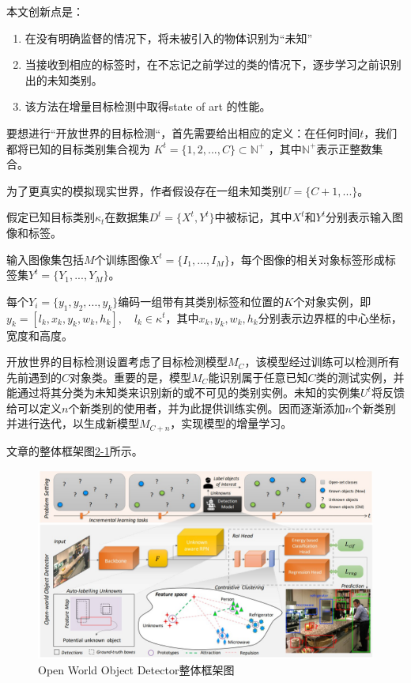 本文创新点是：
\begin{enumerate}
    \item 在没有明确监督的情况下，将未被引入的物体识别为“未知”
    \item 当接收到相应的标签时，在不忘记之前学过的类的情况下，逐步学习之前识别出的未知类别。
    \item 该方法在增量目标检测中取得state of art 的性能。\\
\end{enumerate}

要想进行“开放世界的目标检测“，首先需要给出相应的定义：在任何时间$t$，我们都将已知的目标类别集合视为 $K^t = \{1,2,...,C\} \subset \mathds{N}^+$ ，其中$\mathds{N}^+$表示正整数集合。

为了更真实的模拟现实世界，作者假设存在一组未知类别$U = \{C+1,...\}$。

假定已知目标类别$\kappa_t$在数据集$D^t = \{X^t,Y^t\}$中被标记，其中$X^t$和$Y^t$分别表示输入图像和标签。

输入图像集包括$M$个训练图像$X^t = \{I_1,...,I_M\}$，每个图像的相关对象标签形成标签集$Y^t = \{Y_1,...,Y_M\}$。

每个$Y_i=\{y_1,y_2,...,y_k\}$编码一组带有其类别标签和位置的$K$个对象实例，即 $y_k=[l_k,x_k,y_k,w_k,h_k], \quad l_k \in \kappa^t$，其中$x_k,y_k,w_k,h_k$分别表示边界框的中心坐标，宽度和高度。

开放世界的目标检测设置考虑了目标检测模型$M_C$，该模型经过训练可以检测所有先前遇到的$C$对象类。重要的是，模型$M_C$能识别属于任意已知$C$类的测试实例，并能通过将其分类为未知类来识别新的或不可见的类别实例。未知的实例集$U^t$将反馈给可以定义$n$个新类别的使用者，并为此提供训练实例。因而逐渐添加$n$个新类别并进行迭代，以生成新模型$M_{C+n}$，实现模型的增量学习。

文章的整体框架图\href{fig:2-1}{2-1}所示。
\begin{figure}
  \centering
  \includegraphics[width=5.5in]{figure/example/OpenSet5.jpg}
  \caption{Open World Object Detector整体框架图}
  \label{fig:2-1}
\end{figure}


